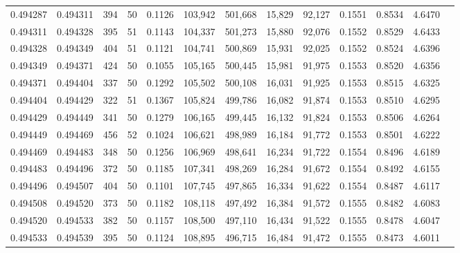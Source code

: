 \begin{tabular}{rrrrrrrrrrrrr}
0.494287 & 0.494311 & 394 &  50 &                                     0.1126 & 103,942 & 501,668 &  15,829 &  92,127 & 0.1551 & 0.8534 & 4.6470 \\
0.494311 & 0.494328 & 395 &  51 &                                     0.1143 & 104,337 & 501,273 &  15,880 &  92,076 & 0.1552 & 0.8529 & 4.6433 \\
0.494328 & 0.494349 & 404 &  51 &                                     0.1121 & 104,741 & 500,869 &  15,931 &  92,025 & 0.1552 & 0.8524 & 4.6396 \\
0.494349 & 0.494371 & 424 &  50 &                                     0.1055 & 105,165 & 500,445 &  15,981 &  91,975 & 0.1553 & 0.8520 & 4.6356 \\
0.494371 & 0.494404 & 337 &  50 &                                     0.1292 & 105,502 & 500,108 &  16,031 &  91,925 & 0.1553 & 0.8515 & 4.6325 \\
0.494404 & 0.494429 & 322 &  51 &                                     0.1367 & 105,824 & 499,786 &  16,082 &  91,874 & 0.1553 & 0.8510 & 4.6295 \\
0.494429 & 0.494449 & 341 &  50 &                                     0.1279 & 106,165 & 499,445 &  16,132 &  91,824 & 0.1553 & 0.8506 & 4.6264 \\
0.494449 & 0.494469 & 456 &  52 &                                     0.1024 & 106,621 & 498,989 &  16,184 &  91,772 & 0.1553 & 0.8501 & 4.6222 \\
0.494469 & 0.494483 & 348 &  50 &                                     0.1256 & 106,969 & 498,641 &  16,234 &  91,722 & 0.1554 & 0.8496 & 4.6189 \\
0.494483 & 0.494496 & 372 &  50 &                                     0.1185 & 107,341 & 498,269 &  16,284 &  91,672 & 0.1554 & 0.8492 & 4.6155 \\
0.494496 & 0.494507 & 404 &  50 &                                     0.1101 & 107,745 & 497,865 &  16,334 &  91,622 & 0.1554 & 0.8487 & 4.6117 \\
0.494508 & 0.494520 & 373 &  50 &                                     0.1182 & 108,118 & 497,492 &  16,384 &  91,572 & 0.1555 & 0.8482 & 4.6083 \\
0.494520 & 0.494533 & 382 &  50 &                                     0.1157 & 108,500 & 497,110 &  16,434 &  91,522 & 0.1555 & 0.8478 & 4.6047 \\
0.494533 & 0.494539 & 395 &  50 &                                     0.1124 & 108,895 & 496,715 &  16,484 &  91,472 & 0.1555 & 0.8473 & 4.6011 \\

\end{tabular}
